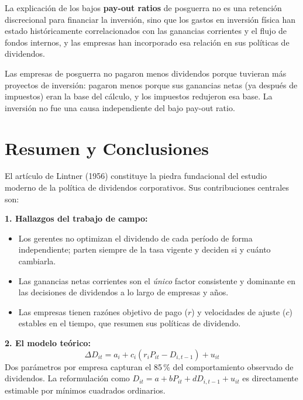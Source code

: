 \documentclass[12pt]{article}
\begin{document}
La explicaci\'on de los bajos \textbf{pay-out ratios} de posguerra no es una retenci\'on
discrecional para financiar la inversi\'on, sino que los gastos en inversi\'on f\'isica
han estado hist\'oricamente correlacionados con las ganancias corrientes y el flujo de
fondos internos, y las empresas han incorporado esa relaci\'on en sus pol\'iticas de dividendos.

\begin{intuicion}
Las empresas de posguerra no pagaron menos dividendos porque tuvieran m\'as proyectos de
inversi\'on: pagaron menos porque sus ganancias netas (ya despu\'es de impuestos) eran la
base del c\'alculo, y los impuestos redujeron esa base. La inversi\'on no fue una causa
independiente del bajo pay-out ratio.
\end{intuicion}

\section{Resumen y Conclusiones}

El art\'iculo de Lintner (1956) constituye la piedra fundacional del estudio moderno de la
pol\'itica de dividendos corporativos. Sus contribuciones centrales son:

\medskip
\noindent \textbf{1. Hallazgos del trabajo de campo:}
\begin{itemize}
  \item Los gerentes no optimizan el dividendo de cada per\'iodo de forma independiente;
        parten siempre de la tasa vigente y deciden si y cu\'anto cambiarla.
  \item Las ganancias netas corrientes son el \textit{\'unico} factor consistente y dominante
        en las decisiones de dividendos a lo largo de empresas y a\~nos.
  \item Las empresas tienen raz\'ones objetivo de pago ($r$) y velocidades de ajuste ($c$)
        estables en el tiempo, que resumen sus pol\'iticas de dividendo.
\end{itemize}

\noindent \textbf{2. El modelo te\'orico:}
\begin{equation*}
  \Delta D_{it} = a_i + c_i\!\left(r_i P_{it} - D_{i,t-1}\right) + u_{it}
\end{equation*}
Dos par\'ametros por empresa capturan el 85\,\% del comportamiento observado de dividendos.
La reformulaci\'on como $D_{it} = a + b P_{it} + d D_{i,t-1} + u_{it}$ es directamente
estimable por m\'inimos cuadrados ordinarios.
\end{document}
